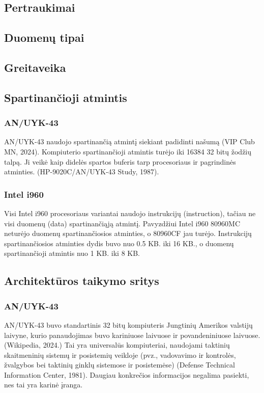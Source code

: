 \documentclass{article}
\begin{document}
\subsection{Pertraukimai}
\subsection{Duomenų tipai}
\subsection{Greitaveika}
\subsection{Spartinančioji atmintis}
\subsubsection{AN/UYK-43}
AN/UYK-43 naudojo spartinančią atmintį siekiant padidinti našumą (VIP Club MN, 2024). Kompiuterio spartinančioji atmintis turėjo iki 16384 32 bitų žodžių talpą. Ji veikė kaip didelės spartos buferis tarp procesoriaus ir pagrindinės atminties. (HP-9020C/AN/UYK-43 Study, 1987).
\subsubsection{Intel i960}
Visi Intel i960 procesoriaus variantai naudojo instrukcijų (instruction), tačiau ne visi duomenų (data) spartinančiąją atmintį. Pavyzdžiui Intel i960 80960MC neturėjo duomenų spartinančiosios atminties, o 80960CF jau turėjo. Instrukcijų spartinančiosios atminties dydis buvo nuo 0.5 KB. iki 16 KB., o duomenų spartinančioji atmintis nuo 1 KB. iki 8 KB.
\subsection{Architektūros taikymo sritys}
\subsubsection{AN/UYK-43}
AN/UYK-43 buvo standartinis 32 bitų kompiuteris Jungtinių Amerikos valstijų laivyne, kurio panaudojimas buvo kariniuose laivuose ir povandeniniuose laivuose. (Wikipedia, 2024.) Tai yra universalūs kompiuteriai, naudojami taktinių skaitmeninių sistemų ir posistemių veikloje (pvz., vadovavimo ir kontrolės, žvalgybos bei taktinių ginklų sistemose ir posistemėse) (Defense Technical Information Center, 1981). Daugiau konkrečios informacijos negalima pasiekti, nes tai yra karinė įranga.
\end{document}
